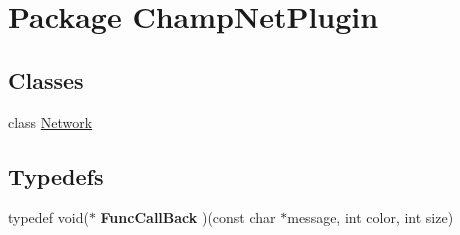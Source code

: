 \hypertarget{namespace_champ_net_plugin}{\section{Package Champ\-Net\-Plugin}
\label{namespace_champ_net_plugin}
}
\subsection*{Classes}
\begin{DoxyCompactItemize}
\item 
class \hyperlink{class_champ_net_plugin_1_1_network}{Network}
\end{DoxyCompactItemize}
\subsection*{Typedefs}
\begin{DoxyCompactItemize}
\item 
\hypertarget{namespace_champ_net_plugin_a95f023a4e052d535ba21ff3bbb13b24c}{typedef void($\ast$ {\bfseries Func\-Call\-Back} )(const char $\ast$message, int color, int size)}\label{namespace_champ_net_plugin_a95f023a4e052d535ba21ff3bbb13b24c}

\end{DoxyCompactItemize}
